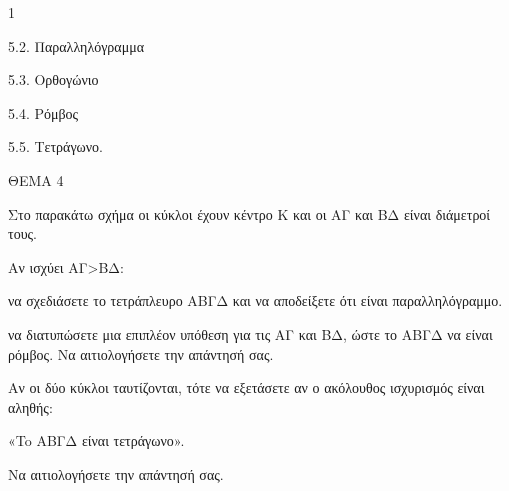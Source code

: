 \begin{ylh}{1}
    \item 5.2. Παραλληλόγραμμα
    \item 5.3. Ορθογώνιο
    \item 5.4. Ρόμβος
    \item 5.5. Τετράγωνο.
\end{ylh}

ΘΕΜΑ 4

Στο παρακάτω σχήμα οι κύκλοι έχουν κέντρο Κ και οι ΑΓ και ΒΔ είναι διάμετροί τους.



\begin{alist}
\item Αν ισχύει ΑΓ\textgreater ΒΔ:

\begin{rlist}
\item να σχεδιάσετε το τετράπλευρο ΑΒΓΔ και να αποδείξετε ότι είναι παραλληλόγραμμο.


\item να διατυπώσετε μια επιπλέον υπόθεση για τις ΑΓ και ΒΔ, ώστε το ΑΒΓΔ να είναι ρόμβος. Να αιτιολογήσετε την απάντησή σας.


\end{rlist}
\item Αν οι δύο κύκλοι ταυτίζονται, τότε να εξετάσετε αν ο ακόλουθος ισχυρισμός είναι αληθής:

«To ΑΒΓΔ είναι τετράγωνο».

Να αιτιολογήσετε την απάντησή σας.

\end{alist}
